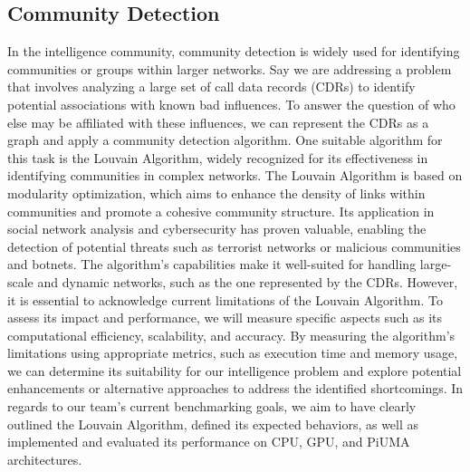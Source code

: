 \documentclass[letterpaper, 10pt]{article}
\begin{document}
\begin{multicols}{2}
        \subsection{Community Detection}\label{section:communityDetection}
            In the intelligence community, community detection is widely used for identifying communities or groups within larger networks. Say we are addressing a problem that involves analyzing a large set of call data records (CDRs) to identify potential associations with known bad influences. To answer the question of who else may be affiliated with these influences, we can represent the CDRs as a graph and apply a community detection algorithm.  One suitable algorithm for this task is the Louvain Algorithm, widely recognized for its effectiveness in identifying communities in complex networks. The Louvain Algorithm is based on modularity optimization, which aims to enhance the density of links within communities and promote a cohesive community structure. Its application in social network analysis and cybersecurity has proven valuable, enabling the detection of potential threats such as terrorist networks or malicious communities and botnets. The algorithm's capabilities make it well-suited for handling large-scale and dynamic networks, such as the one represented by the CDRs.  However, it is essential to acknowledge current limitations of the Louvain Algorithm. To assess its impact and performance, we will measure specific aspects such as its computational efficiency, scalability, and accuracy. By measuring the algorithm's limitations using appropriate metrics, such as execution time and memory usage, we can determine its suitability for our intelligence problem and explore potential enhancements or alternative approaches to address the identified shortcomings. In regards to our team's current benchmarking goals, we aim to have clearly outlined the Louvain Algorithm, defined its expected behaviors, as well as implemented and evaluated its performance on CPU, GPU, and PiUMA architectures. 
            

\end{multicols}
\end{document}

